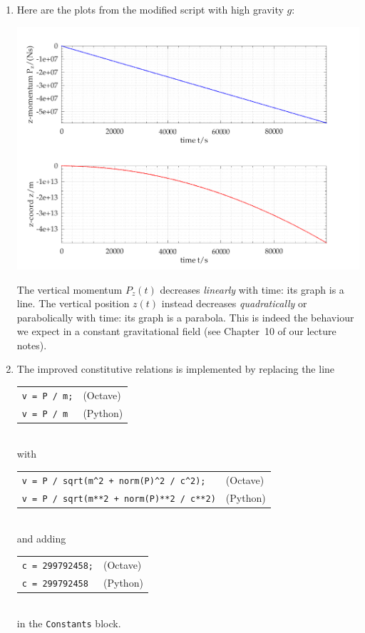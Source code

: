 \documentclass[a4paper,12pt,%
onecolumn,oneside,%
british%
]{memoir}
\renewcommand*{\|}[1][]{\nonscript\:#1\vert\nonscript\:\mathopen{}}
\newcommand*{\chap}{Chapter}%
\begin{document}
\begin{enumerate}[exerc]
\item Here are the plots from the modified script with high gravity $g$:
  \begin{center}
    \hfill\includegraphics[width=\linewidth]{images/tennisball_highg.pdf}%
  \end{center}

  The vertical momentum $P_{z}(t)$ decreases \emph{linearly} with time: its graph is a line. The vertical position $z(t)$ instead decreases \emph{quadratically} or parabolically with time: its graph is a parabola. This is indeed the behaviour we expect in a constant gravitational field (see \chap~10 of our lecture notes).

\item The improved constitutive relations is implemented by replacing the line
  \\[1ex]\begin{tabular}{ll}
    \verb|v = P / m;| & (Octave)
    \\
    \verb|v = P / m| & (Python)
  \end{tabular}\\[1ex]
  with
  \\[1ex]\begin{tabular}{ll}
    \verb|v = P / sqrt(m^2 + norm(P)^2 / c^2);| & (Octave)
    \\
    \verb|v = P / sqrt(m**2 + norm(P)**2 / c**2)| & (Python)
  \end{tabular}\\[1ex]
and adding
  \\[1ex]\begin{tabular}{ll}
    \verb|c = 299792458;| & (Octave)
    \\
    \verb|c = 299792458| & (Python)
  \end{tabular}\\[1ex]
  in the \texttt{Constants} block.


\end{enumerate}
\end{document}

